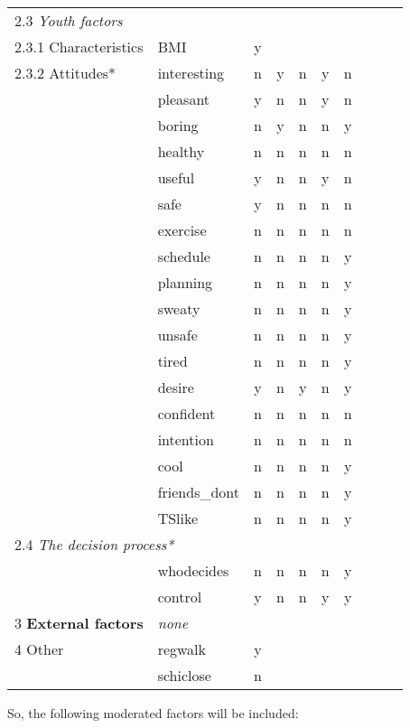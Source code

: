 \documentclass[a4paper]{article}
\begin{document}
\begin{center}
\begin{tabular}{llcccccccc}
\multicolumn{2}{l}{2.3 \textit{Youth factors}} \\
2.3.1 Characteristics     & BMI           &  y  &     &     &     &     \\
2.3.2 Attitudes*          & interesting   &  n  &  y  &  n  &  y  &  n  \\
                          & pleasant      &  y  &  n  &  n  &  y  &  n  \\
                          & boring        &  n  &  y  &  n  &  n  &  y  \\
                          & healthy       &  n  &  n  &  n  &  n  &  n  \\
                          & useful        &  y  &  n  &  n  &  y  &  n  \\
                          & safe          &  y  &  n  &  n  &  n  &  n  \\
                          & exercise      &  n  &  n  &  n  &  n  &  n  \\
                          & schedule      &  n  &  n  &  n  &  n  &  y  \\
                          & planning      &  n  &  n  &  n  &  n  &  y  \\
                          & sweaty        &  n  &  n  &  n  &  n  &  y  \\
                          & unsafe        &  n  &  n  &  n  &  n  &  y  \\
                          & tired         &  n  &  n  &  n  &  n  &  y  \\
                          & desire        &  y  &  n  &  y  &  n  &  y  \\
                          & confident     &  n  &  n  &  n  &  n  &  n  \\
                          & intention     &  n  &  n  &  n  &  n  &  n  \\
                          & cool          &  n  &  n  &  n  &  n  &  y  \\
                          & friends\_dont &  n  &  n  &  n  &  n  &  y  \\
                          & TSlike        &  n  &  n  &  n  &  n  &  y  \\
\multicolumn{2}{l}{2.4 \textit{The decision process*} } \\
                          & whodecides    &  n  &  n  &  n  &  n  &  y  \\
                          & control       &  y  &  n  &  n  &  y  &  y  \\
3  \textbf{External factors}       & \emph{none}   \\
4  Other                  & regwalk       &  y  \\
                          & schiclose     &  n  \\
\bottomrule
\end{tabular}
\end{center}
So, the following moderated factors will be included:
\end{document}
